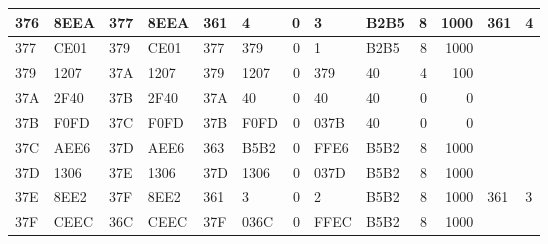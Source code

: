 \begin{center}
\begin{tabular}{|l|l|l|l|l|l|r|l|l|r|r|l|l|}
        \hline
        376          & 8EEA          & 377         & 8EEA        & 361         & 4           & 0           & 3           & B2B5        & 8           & 1000          & 361          & 4             \\
        \hline
        377          & CE01          & 379         & CE01        & 377         & 379         & 0           & 1           & B2B5        & 8           & 1000          &              &               \\
        \hline
        379          & 1207          & 37A         & 1207        & 379         & 1207        & 0           & 379         & 40          & 4           & 100           &              &               \\
        \hline
        37A          & 2F40          & 37B         & 2F40        & 37A         & 40          & 0           & 40          & 40          & 0           & 0             &              &               \\
        \hline
        37B          & F0FD          & 37C         & F0FD        & 37B         & F0FD        & 0           & 037B        & 40          & 0           & 0             &              &               \\
        \hline
        37C          & AEE6          & 37D         & AEE6        & 363         & B5B2        & 0           & FFE6        & B5B2        & 8           & 1000          &              &               \\
        \hline
        37D          & 1306          & 37E         & 1306        & 37D         & 1306        & 0           & 037D        & B5B2        & 8           & 1000          &              &               \\
        \hline
        37E          & 8EE2          & 37F         & 8EE2        & 361         & 3           & 0           & 2           & B5B2        & 8           & 1000          & 361          & 3             \\
        \hline
        37F          & CEEC          & 36C         & CEEC        & 37F         & 036C        & 0           & FFEC        & B5B2        & 8           & 1000          &              &               \\
        \bottomrule
    \end{tabular}
\end{center}

\newpage

